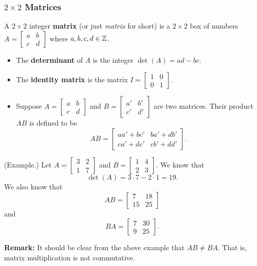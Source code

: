 \documentclass[letterpaper]{article}
\newcommand{\0}{\mathbf{0}}
\begin{document}
\subsubsection{\texorpdfstring{$2 \times 2$ Matrices}{2 by 2 Matrices}}

\begin{definition}{}{}
    A $2 \times 2$ integer \textbf{matrix} (or just \emph{matrix} for short) is a $2 \times 2$ box of numbers $A = \begin{bmatrix}
        a & b \\ c & d
    \end{bmatrix}$ where $a, b, c, d \in \mathbb{Z}$. 
    \begin{itemize}
        \item The \textbf{determinant} of $A$ is the integer $\det(A) = ad - bc$. 
        \item The \textbf{identity matrix} is the matrix $I = \begin{bmatrix}
            1 & 0 \\ 0 & 1
        \end{bmatrix}$. 
        \item Suppose $A = \begin{bmatrix}
            a & b \\ c & d
        \end{bmatrix}$ and $B = \begin{bmatrix}
            a' & b' \\ c' & d'
        \end{bmatrix}$ are two matrices. Their product $AB$ is defined to be \[AB = \begin{bmatrix}
            aa' + bc' & ba' + db' \\ ca' + dc' & cb' + dd'
        \end{bmatrix}.\]
    \end{itemize}
\end{definition}

\begin{mdframed}
    (Example.) Let $A = \begin{bmatrix}
        3 & 2 \\ 1 & 7
    \end{bmatrix}$ and $B = \begin{bmatrix}
        1 & 4 \\ 2 & 3
    \end{bmatrix}$. We know that \[\det(A) = 3 \cdot 7 - 2 \cdot 1 = 19.\] We also know that \[AB = \begin{bmatrix}
        7 & 18 \\ 15 & 25
    \end{bmatrix}\] and \[BA = \begin{bmatrix}
        7 & 30 \\ 9 & 25
    \end{bmatrix}.\] 
\end{mdframed}
\textbf{Remark:} It should be clear from the above example that $AB \neq BA$. That is, matrix multiplication is not commutative. 
\end{document}
